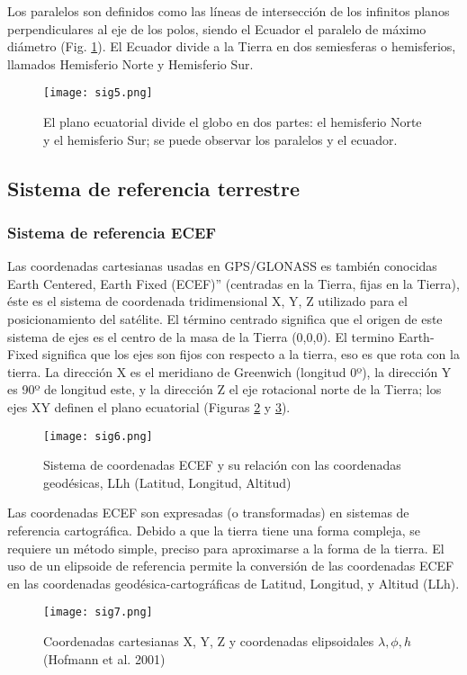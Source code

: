 Los paralelos son definidos como las líneas de intersección de los infinitos planos perpendiculares al eje de los polos, siendo el Ecuador el paralelo de máximo diámetro (Fig. \ref{sig5}). El Ecuador divide a la Tierra en dos semiesferas o hemisferios, llamados Hemisferio Norte y Hemisferio Sur.
\begin{figure}[h!]
\centering
  \texttt{[image: sig5.png]}
  \caption{El plano ecuatorial divide el globo en dos partes: el hemisferio Norte y el hemisferio Sur; se puede observar los paralelos y el ecuador.  }
  \label{sig5}
\end{figure}

\subsection{Sistema de referencia terrestre}

\subsubsection{Sistema de referencia ECEF}
Las coordenadas cartesianas usadas en GPS/GLONASS es también conocidas  Earth Centered, Earth Fixed (ECEF)” (centradas en la Tierra, fijas en la Tierra), éste es el sistema de coordenada tridimensional X, Y, Z utilizado para el posicionamiento del satélite. El término centrado significa que el origen de este sistema de ejes es el centro de la masa de la Tierra (0,0,0). El termino Earth-Fixed significa que los ejes son fijos con respecto a la tierra, eso es que rota con la tierra. La dirección X es el meridiano de Greenwich (longitud 0º), la dirección Y es 90º de longitud este, y la dirección Z el eje rotacional norte de la Tierra; los ejes XY definen el plano ecuatorial (Figuras \ref{sig6} y \ref{sig7}). 
\begin{figure}[h!]
\centering
  \texttt{[image: sig6.png]}
  \caption{Sistema de coordenadas ECEF y su relación con las coordenadas geodésicas, LLh (Latitud, Longitud, Altitud)}
  \label{sig6}
\end{figure}
Las coordenadas ECEF son expresadas (o transformadas)  en sistemas de referencia  cartográfica. Debido a que la tierra tiene una forma compleja, se requiere un método simple, preciso para aproximarse a la forma de la tierra.   El uso de un elipsoide de referencia permite la conversión de las coordenadas ECEF en las coordenadas geodésica-cartográficas de Latitud, Longitud, y Altitud (LLh). 
\begin{figure}[h!]
\centering
  \texttt{[image: sig7.png]}
  \caption{Coordenadas cartesianas X, Y, Z y coordenadas elipsoidales $\lambda,\phi,h$ (Hofmann et al. 2001)}
  \label{sig7}
\end{figure}
